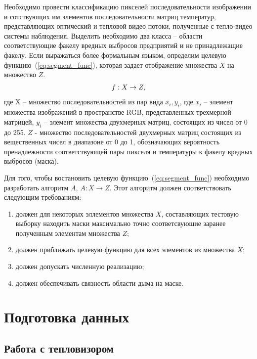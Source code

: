 \documentclass[14pt, a4paper]{extreport}
\begin{document}
	Необходимо провести классификацию пикселей последовательности изображении и сотствующих им элементов последовательности матриц температур, представляющих оптический и тепловой видео потоки, полученные с тепло-видео системы наблюдения. Выделить необходимо два класса -- области соответствующие факелу вредных выбросов предприятий и не принадлежащие факелу. Если выражаться более формальным языком, определим целевую функцию~(\ref{eq:segment_func}), которая задает отображение множества $X$ на множество $Z$.
	\vspace*{-0.2cm}
	\begin{equation}
		f: X \rightarrow Z,
		\label{eq:segment_func}
		\vspace*{-0.4cm}
	\end{equation}
	где X -- множество последовательностей из пар вида $x_i, y_i$, где $x_i$ -- элемент множества изображений в пространстве RGB, представленных трехмерной матрицей, $y_i$ -- элемент множества двухмерных матриц, состоящих из чисел от 0 до 255. $Z$ - множество последовательностей двухмерных матриц состоящих из вещественных чисел в диапазоне от 0 до 1, обозначающих вероятность пренадлежности соответствующей пары пикселя и температуры к факелу вредных выбросов (маска).
	
	Для того, чтобы востановить целевую функцию~(\ref{eq:segment_func}) необходимо разработать алгоритм $A$, $A: X \rightarrow Z$. Этот алгоритм должен соответствовать следующим требованиям:
	\begin{enumerate}[label={\arabic*)}]
		\item должен для некоторых эллементов множества $X$, составляющих тестовую выборку находить маски максимально точно соответсвующие заранее полученным элементам множества $Z$;
		\item должен приближать целевую функцию для всех элементов из множества $X$;
		\item должен допускать численную реализацию;
		\item должен обеспечивать связность области дыма на маске.
	\end{enumerate}

\section{Подготовка данных}
\subsection{Работа с тепловизором}
\end{document}
